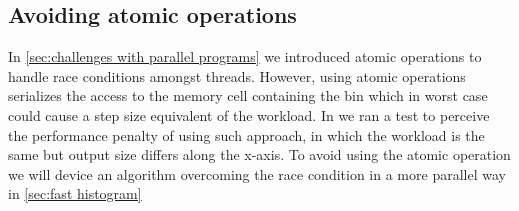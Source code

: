 \subsection{Avoiding atomic operations}
In \cref{sec:challenges with parallel programs} we introduced atomic operations to handle race conditions amongst threads.
However, using atomic operations serializes the access to the memory cell containing the bin which in worst case could cause a step size equivalent of the workload.
In  we ran a test to perceive the performance penalty of using such approach, in which the workload is the same but output size differs along the x-axis.
To avoid using the atomic operation we will device an algorithm overcoming the race condition in a more parallel way in \cref{sec:fast histogram}
